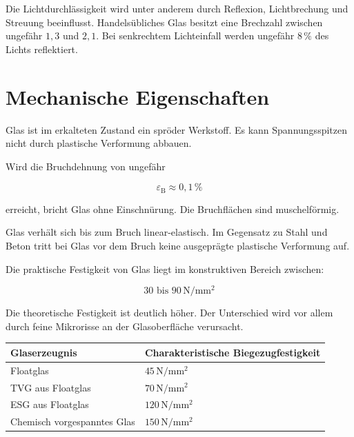 \documentclass[
  12pt,
  a4paper,
  oneside
]{scrreprt}
\begin{document}
Die Lichtdurchlässigkeit wird unter anderem durch Reflexion,
Lichtbrechung und Streuung beeinflusst. Handelsübliches Glas besitzt
eine Brechzahl zwischen ungefähr $1{,}3$ und $2{,}1$. Bei senkrechtem
Lichteinfall werden ungefähr $8\,\%$ des Lichts reflektiert.


\section{Mechanische Eigenschaften}

Glas ist im erkalteten Zustand ein spröder Werkstoff. Es kann
Spannungsspitzen nicht durch plastische Verformung abbauen.


Wird die Bruchdehnung von ungefähr

\begin{equation}
  \varepsilon_\mathrm{B} \approx 0{,}1\,\%
\end{equation}

erreicht, bricht Glas ohne Einschnürung. Die Bruchflächen sind
muschelförmig. 

Glas verhält sich bis zum Bruch linear-elastisch. Im Gegensatz zu Stahl
und Beton tritt bei Glas vor dem Bruch keine ausgeprägte plastische
Verformung auf. 

Die praktische Festigkeit von Glas liegt im konstruktiven Bereich
zwischen:

\begin{equation}
  30 \text{ bis } 90\,\mathrm{N/mm^2}
\end{equation}

Die theoretische Festigkeit ist deutlich höher. Der Unterschied wird
vor allem durch feine Mikrorisse an der Glasoberfläche verursacht.


\begin{longtable}{
  >{\raggedright\arraybackslash}p{}
  >{\centering\arraybackslash}p{}
}
\toprule
\textbf{Glaserzeugnis} &
\textbf{Charakteristische Biegezugfestigkeit} \\
\midrule
\endhead

Floatglas &
$45\,\mathrm{N/mm^2}$ \\

TVG aus Floatglas &
$70\,\mathrm{N/mm^2}$ \\

ESG aus Floatglas &
$120\,\mathrm{N/mm^2}$ \\

Chemisch vorgespanntes Glas &
$150\,\mathrm{N/mm^2}$ \\

\bottomrule
\end{longtable}
\end{document}
